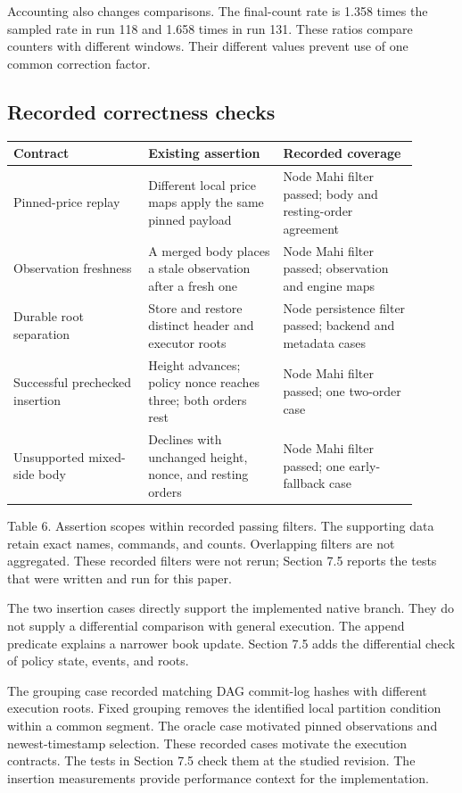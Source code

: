 \documentclass[11pt]{article}
\begin{document}
Accounting also changes comparisons. The final-count rate is 1.358 times the sampled rate in run 118 and 1.658 times in run 131. These ratios compare counters with different windows. Their different values prevent use of one common correction factor. \cite{R13}

\subsection{Recorded correctness checks}
{\small\begin{longtable}{@{}p{0.300\linewidth}p{0.300\linewidth}p{0.300\linewidth}@{}}
\toprule
Contract & Existing assertion & Recorded coverage \\
\midrule
\endhead
Pinned-price replay & Different local price maps apply the same pinned payload & Node Mahi filter passed; body and resting-order agreement \\
Observation freshness & A merged body places a stale observation after a fresh one & Node Mahi filter passed; observation and engine maps \\
Durable root separation & Store and restore distinct header and executor roots & Node persistence filter passed; backend and metadata cases \\
Successful prechecked insertion & Height advances; policy nonce reaches three; both orders rest & Node Mahi filter passed; one two-order case \\
Unsupported mixed-side body & Declines with unchanged height, nonce, and resting orders & Node Mahi filter passed; one early-fallback case \\
\bottomrule
\end{longtable}}
Table 6. Assertion scopes within recorded passing filters. The supporting data retain exact names, commands, and counts. Overlapping filters are not aggregated. These recorded filters were not rerun; Section 7.5 reports the tests that were written and run for this paper. \cite{R14,R27}

The two insertion cases directly support the implemented native branch. They do not supply a differential comparison with general execution. The append predicate explains a narrower book update. Section 7.5 adds the differential check of policy state, events, and roots.

The grouping case recorded matching DAG commit-log hashes with different execution roots. Fixed grouping removes the identified local partition condition within a common segment. The oracle case motivated pinned observations and newest-timestamp selection. These recorded cases motivate the execution contracts. The tests in Section 7.5 check them at the studied revision. The insertion measurements provide performance context for the implementation. \cite{R13,R15,R16}
\end{document}
